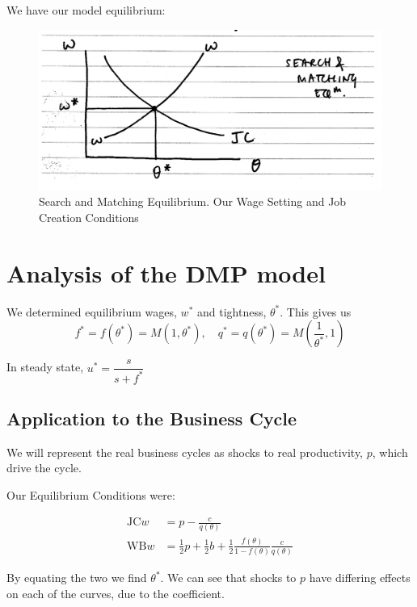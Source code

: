 \documentclass[11pt]{article}
\begin{document}
We have our model equilibrium:

\begin{figure}[h]
    \centering
    \includegraphics[width=12cm]{photos/search and matching equilibrium.png}
    \caption{Search and Matching Equilibrium. Our Wage Setting and Job Creation Conditions}
    \label{fig:search and matching equilibrium}
\end{figure}

\section{Analysis of the DMP model}

We determined equilibrium wages, $w^*$ and tightness, $\theta^*$. This gives us
\[f^* = f(\theta^*) = M(1,\theta^*), \quad q^* = q(\theta^*) = M(\frac{1}{\theta^*},1)\]

In steady state, $u^* = \dfrac{s}{s+f^*}$

\subsection{Application to the Business Cycle}

We will represent the real business cycles as shocks to real productivity, $p$, which drive the cycle.

Our Equilibrium Conditions were:

\begin{equation}
\begin{aligned}
\mathrm{JC} w & =p-\frac{c}{q(\theta)} \\
\mathrm{WB} w & =\frac{1}{2} p+\frac{1}{2} b+\frac{1}{2} \frac{f(\theta)}{1-f(\theta)} \frac{c}{q(\theta)}
\end{aligned}
\end{equation}

By equating the two we find $\theta^*$. We can see that shocks to $p$ have differing effects on each of the curves, due to the coefficient.
\end{document}
